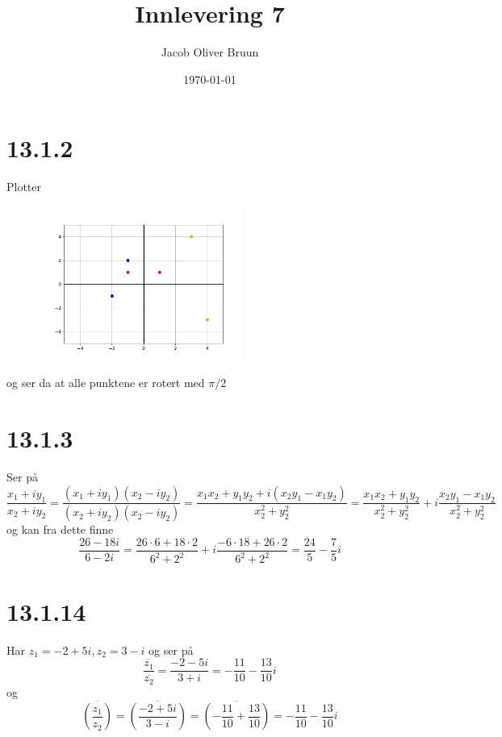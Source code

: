 \documentclass{report}
\title{Innlevering 7}
\author{Jacob Oliver Bruun}
\date{\today}
\newcommand{\nbrack}[1]{\left( #1 \right)}
\begin{document}
\section*{13.1.2}
Plotter
\begin{figure}[H]
  \centering
  \includegraphics[width=0.6\textwidth]{code/oppg1.pdf}
\end{figure}
og ser da at alle punktene er rotert med $\pi / 2$


\section*{13.1.3}
Ser på
\begin{equation}
  \label{eq:1}
  \frac{x_{1} + iy_{1}}{x_{2} + iy_{2}}
  = \frac{\nbrack{x_{1} + iy_{1}} \nbrack{x_{2} - iy_{2}}}{\nbrack{x_{2} + iy_{2}} \nbrack{x_{2} - iy_{2}}}
  = \frac{ x_{1}x_{2} + y_{1}y_{2} + i \nbrack{ x_{2}y_{1} - x_{1}y_{2} } }{x_{2}^{2}  + y_{2}^{2}}
  = \frac{ x_{1}x_{2} + y_{1}y_{2} }{x_{2}^{2}  + y_{2}^{2}} + i\frac{ x_{2}y_{1} - x_{1}y_{2} }{x_{2}^{2}  + y_{2}^{2}}
\end{equation}
og kan fra dette finne
\begin{equation}
  \label{eq:2}
  \frac{26-18i}{6-2i}
  = \frac{26\cdot 6 + 18\cdot 2}{6^{2} + 2^{2}} + i\frac{-6\cdot 18 + 26\cdot 2}{6^{2} + 2^{2}}
  = \frac{24}{5} - \frac{7}{5}i
\end{equation}


\section*{13.1.14}
Har $z_{1} = -2 + 5i, z_{2} = 3 - i$ og ser på
\begin{equation}
  \label{eq:3}
  \frac{\overline{z_{1}}}{\overline{z_{2}}} = \frac{-2 - 5i}{3 + i} = -\frac{11}{10} - \frac{13}{10}i
\end{equation}
og
\begin{equation}
  \label{eq:4}
  \overline{ \nbrack{ \frac{z_{1}}{z_{2}} } } = \overline{ \nbrack{\frac{-2 + 5i}{3-i}} }
  = \overline{ \nbrack{ -\frac{11}{10} + \frac{13}{10} } } = -\frac{11}{10} - \frac{13}{10}i
\end{equation}
\end{document}
